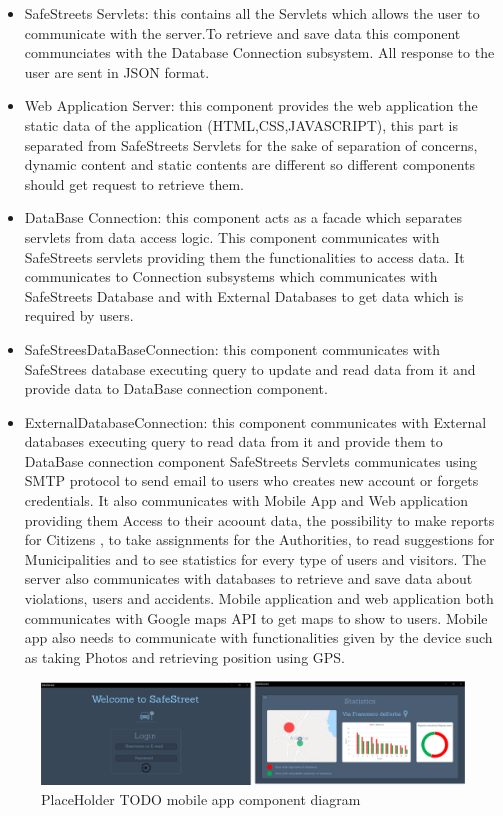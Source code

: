 \begin{itemize}
\item SafeStreets Servlets: this contains all the Servlets which allows the user to communicate with the server.To retrieve and save data this component communciates with the Database Connection subsystem. All response to the user are sent in JSON format. 
\item Web Application Server: this component provides the web application the static data of the application (HTML,CSS,JAVASCRIPT), this part is separated from SafeStreets Servlets for the sake of separation of concerns, dynamic content and static contents are different so different components should get request to retrieve them.
\item DataBase Connection: this component acts as a facade which separates servlets from data access logic. This component communicates with SafeStreets servlets providing them the functionalities to access data.
It communicates to Connection subsystems which communicates with SafeStreets Database and with External Databases to get data which is required by users.
\item SafeStreesDataBaseConnection: this component communicates with SafeStrees database executing query to update and read data from it and provide data to DataBase connection component. 
\item ExternalDatabaseConnection: this component communicates with External databases executing query to read data from it and provide them to DataBase connection component
SafeStreets Servlets communicates using SMTP protocol to send email to users who creates new account or forgets credentials. It also communicates with Mobile App and Web application providing them Access to their acoount data, the possibility to make reports for Citizens , to take assignments for the Authorities, to read suggestions for Municipalities and to see statistics for every type of users and visitors.
The server also communicates with databases to retrieve and save data about violations, users and accidents.
Mobile application and web application both communicates with Google maps API  to get maps to show to users. Mobile app also needs to communicate with functionalities given by the device such as taking Photos and retrieving position using GPS.
\end{itemize}
\begin{figure}[h]
\centering
\includegraphics[width=\textwidth]{Images/desktop_common_interface.png}
\caption{\label{fig:ComWI}PlaceHolder TODO mobile app component diagram}
\end{figure}
